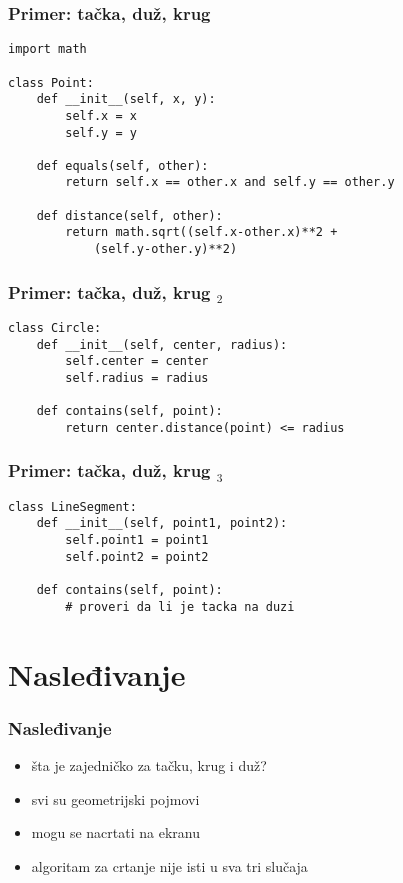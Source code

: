 \documentclass[utf8,compress,aspectratio=169]{beamer}
\begin{document}
\begin{frame}
  \frametitle{Primer: tačka, duž, krug}
\begin{verbatim}
import math

class Point:
    def __init__(self, x, y):
        self.x = x
        self.y = y

    def equals(self, other):
        return self.x == other.x and self.y == other.y

    def distance(self, other):
        return math.sqrt((self.x-other.x)**2 +
            (self.y-other.y)**2)
\end{verbatim}
\end{frame}

\begin{frame}[fragile]
  \frametitle{Primer: tačka, duž, krug $_2$}
\begin{verbatim}
class Circle:
    def __init__(self, center, radius):
        self.center = center
        self.radius = radius

    def contains(self, point):
        return center.distance(point) <= radius
\end{verbatim}
\end{frame}

\begin{frame}[fragile]
  \frametitle{Primer: tačka, duž, krug $_3$}
\begin{verbatim}
class LineSegment:
    def __init__(self, point1, point2):
        self.point1 = point1
        self.point2 = point2

    def contains(self, point):
        # proveri da li je tacka na duzi
\end{verbatim}
\end{frame}

\section[Nasleđivanje]{Nasleđivanje}

\begin{frame}[fragile]
  \frametitle{Nasleđivanje}
  \begin{itemize}
    \item šta je zajedničko za tačku, krug i duž?
    \item svi su geometrijski pojmovi
    \item mogu se nacrtati na ekranu
    \item algoritam za crtanje nije isti u sva tri slučaja
  \end{itemize}
\end{frame}
\end{document}
